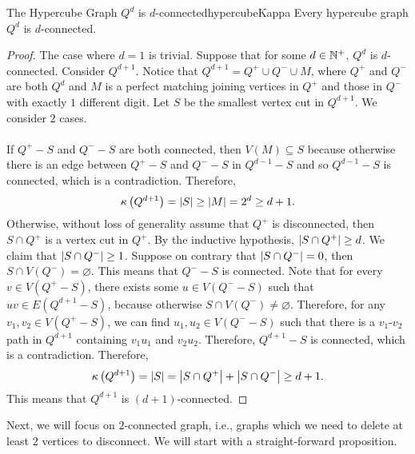 \documentclass[math, code]{amznotes}
\theoremstyle{remark}
\begin{document}
\begin{probox}{The Hypercube Graph $Q^d$ is $d$-connected}{hypercubeKappa}
    Every hypercube graph $Q^d$ is $d$-connected.
    \tcblower
    \begin{proof}
        The case where $d = 1$ is trivial. Suppose that for some $d \in \mathbb{N}^+$, $Q^d$ is $d$-connected. Consider $Q^{d + 1}$. Notice that $Q^{d + 1} = Q^+ \cup Q^- \cup M$, where $Q^+$ and $Q^-$ are both $Q^d$ and $M$ is a perfect matching joining vertices in $Q^+$ and those in $Q^-$ with exactly $1$ different digit. Let $S$ be the smallest vertex cut in $Q^{d + 1}$. We consider $2$ cases.
        \\\\
        If $Q^+ - S$ and $Q^- - S$ are both connected, then $V(M) \subseteq S$ because otherwise there is an edge between $Q^+ - S$ and $Q^- - S$ in $Q^{d - 1} - S$ and so $Q^{d - 1} - S$ is connected, which is a contradiction. Therefore,
        \begin{equation*}
            \kappa\left(Q^{d + 1}\right) = {\left\lvert {S} \right\rvert} \geq {\left\lvert {M} \right\rvert} = 2^{d} \geq d + 1.
        \end{equation*}
        Otherwise, without loss of generality assume that $Q^+$ is disconnected, then $S \cap Q^+$ is a vertex cut in $Q^+$. By the inductive hypothesis, ${\left\lvert {S \cap Q^+} \right\rvert} \geq d$. We claim that ${\left\lvert {S \cap Q^-} \right\rvert} \geq 1$. Suppose on contrary that ${\left\lvert {S \cap Q^-} \right\rvert} = 0$, then $S \cap V\left(Q^-\right) = \varnothing$. This means that $Q^- - S$ is connected. Note that for every $v \in V\left(Q^+ - S\right)$, there exists some $u \in V\left(Q^- - S\right)$ such that $uv \in E\left(Q^{d + 1} - S\right)$, because otherwise $S \cap V\left(Q^-\right) \neq \varnothing$. Therefore, for any $v_1, v_2 \in V\left(Q^+ - S\right)$, we can find $u_1, u_2 \in V\left(Q^- - S\right)$ such that there is a $v_1$-$v_2$ path in $Q^{d + 1}$ containing $v_1u_1$ and $v_2u_2$. Therefore, $Q^{d + 1} - S$ is connected, which is a contradiction. Therefore, 
        \begin{equation*}
            \kappa\left(Q^{d + 1}\right) = {\left\lvert {S} \right\rvert} = {\left\lvert {S \cap Q^+} \right\rvert} + {\left\lvert {S \cap Q^-} \right\rvert} \geq d + 1.
        \end{equation*}
        This means that $Q^{d + 1}$ is $(d + 1)$-connected.
    \end{proof}
\end{probox}
Next, we will focus on $2$-connected graph, i.e., graphs which we need to delete at least $2$ vertices to disconnect. We will start with a straight-forward proposition.
\end{document}
